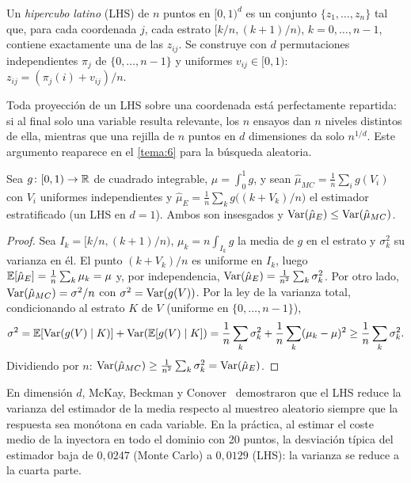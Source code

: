 \begin{definicion}\label{def:lhs}
Un \emph{hipercubo latino} (LHS) de $n$ puntos en $[0,1)^d$ es un conjunto $\{z_1,\dots,z_n\}$ tal que, para cada coordenada $j$, cada estrato $[k/n,(k+1)/n)$, $k=0,\dots,n-1$, contiene exactamente una de las $z_{ij}$. Se construye con $d$ permutaciones independientes $\pi_j$ de $\{0,\dots,n-1\}$ y uniformes $v_{ij}\in[0,1)$: $z_{ij}=(\pi_j(i)+v_{ij})/n$.
\end{definicion}

Toda proyección de un LHS sobre una coordenada está perfectamente repartida: si al final solo una variable resulta relevante, los $n$ ensayos dan $n$ niveles distintos de ella, mientras que una rejilla de $n$ puntos en $d$ dimensiones da solo $n^{1/d}$. Este argumento reaparece en el \cref{tema:6} para la búsqueda aleatoria.

\begin{teorema}\label{teo:estratificado}
Sea $g\colon[0,1)\to\mathbb{R}$ de cuadrado integrable, $\mu=\int_0^1g$, y sean $\hat\mu_{MC}=\frac1n\sum_ig(V_i)$ con $V_i$ uniformes independientes y $\hat\mu_{E}=\frac1n\sum_{k}g\bigl((k+V_k)/n\bigr)$ el estimador estratificado (un LHS en $d=1$). Ambos son insesgados y $\operatorname{Var}(\hat\mu_E)\le\operatorname{Var}(\hat\mu_{MC})$.
\end{teorema}

\begin{proof}
Sea $I_k=[k/n,(k+1)/n)$, $\mu_k=n\int_{I_k}g$ la media de $g$ en el estrato y $\sigma_k^2$ su varianza en él. El punto $(k+V_k)/n$ es uniforme en $I_k$, luego $\mathbb{E}[\hat\mu_E]=\frac1n\sum_k\mu_k=\mu$ y, por independencia, $\operatorname{Var}(\hat\mu_E)=\frac1{n^2}\sum_k\sigma_k^2$. Por otro lado, $\operatorname{Var}(\hat\mu_{MC})=\sigma^2/n$ con $\sigma^2=\operatorname{Var}(g(V))$. Por la ley de la varianza total, condicionando al estrato $K$ de $V$ (uniforme en $\{0,\dots,n-1\}$),
\[
\sigma^2=\mathbb{E}[\operatorname{Var}(g(V)\mid K)]+\operatorname{Var}(\mathbb{E}[g(V)\mid K])=\frac1n\sum_k\sigma_k^2+\frac1n\sum_k(\mu_k-\mu)^2\ge\frac1n\sum_k\sigma_k^2 .
\]
Dividiendo por $n$: $\operatorname{Var}(\hat\mu_{MC})\ge\frac1{n^2}\sum_k\sigma_k^2=\operatorname{Var}(\hat\mu_E)$.
\end{proof}

En dimensión $d$, McKay, Beckman y Conover~\cite[§2.1]{mckay} demostraron que el LHS reduce la varianza del estimador de la media respecto al muestreo aleatorio siempre que la respuesta sea monótona en cada variable. En la práctica, al estimar el coste medio de la inyectora en todo el dominio con 20 puntos, la desviación típica del estimador baja de $0{,}0247$ (Monte Carlo) a $0{,}0129$ (LHS): la varianza se reduce a la cuarta parte.

